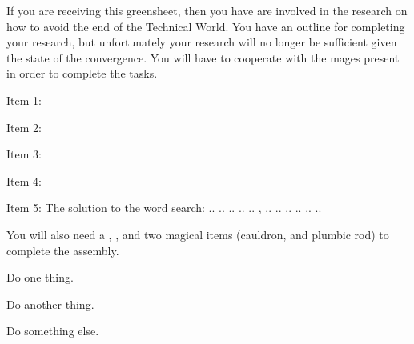 \documentclass[green]{guildcamp3}
\begin{document}
\name{\gSaveTheWorldScientists{}}






If you are receiving this greensheet, then you have are involved in the research on how to avoid the end of the Technical World. You have an outline for completing your research, but unfortunately your research will no longer be sufficient given the state of the convergence. You will have to cooperate with the mages present in order to complete the tasks. 

Item 1:

Item 2:

Item 3:

Item 4:

Item 5: The solution to the word search: .. .. .. .. ..  ,  .. .. .. .. .. ..

You will also need a \iMultitool{}, \iScrewdriver{}, and two magical items (cauldron, and plumbic rod) to complete the assembly. 

\begin{enum}[Directions]
  \item Do one thing.
  \item Do another thing.
  \item Do something else.
\end{enum}
\end{document}
